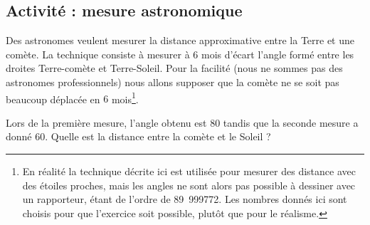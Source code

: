 
\subsection*{Activité : mesure astronomique}

Des astronomes veulent mesurer la distance approximative entre la Terre et une comète. La technique consiste à mesurer à \( 6\) mois d'écart l'angle formé entre les droites Terre-comète et Terre-Soleil. Pour la facilité (nous ne sommes pas des astronomes professionnels) nous allons supposer que la comète ne se soit pas beaucoup déplacée en \( 6\) mois\footnote{En réalité la technique décrite ici est utilisée pour mesurer des distance avec des étoiles proches, mais les angles ne sont alors pas possible à dessiner avec un rapporteur, étant de l'ordre de \unit{89.999772}{\degree}. Les nombres donnés ici sont choisis pour que l'exercice soit possible, plutôt que pour le réalisme.}.

Lors de la première mesure, l'angle obtenu est \unit{80}{\degree} tandis que la seconde mesure a donné \unit{60}{\degree}. Quelle est la distance entre la comète et le Soleil ?
